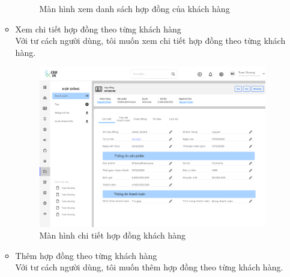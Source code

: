 \documentclass[12pt,a4paper]{article}
\begin{document}
\begin{enumerate}
\begin{itemize}
\begin{figure}[H]
                \vspace{0.5cm}
                \caption{Màn hình xem danh sách hợp đồng của khách hàng}
                \label{dshopdongKH}
            \end{figure}
            \item Xem chi tiết hợp đồng theo từng khách hàng
            \\Với tư cách người dùng, tôi muốn xem chi tiết hợp đồng theo từng khách hàng.
            \begin{figure}[H]
                \centering \includegraphics[width=\textwidth]{Img/Nguyet/Khachhang/chitiethopdongKH.png}
                \vspace{0.5cm}
                \caption{Màn hình chi tiết hợp đồng khách hàng}
                \label{chitietHDKH}
            \end{figure}
            \item Thêm hợp đồng theo từng khách hàng \\
            Với tư cách người dùng, tôi muốn thêm hợp đồng theo từng khách hàng.


\end{itemize}
\end{enumerate}
\end{document}
